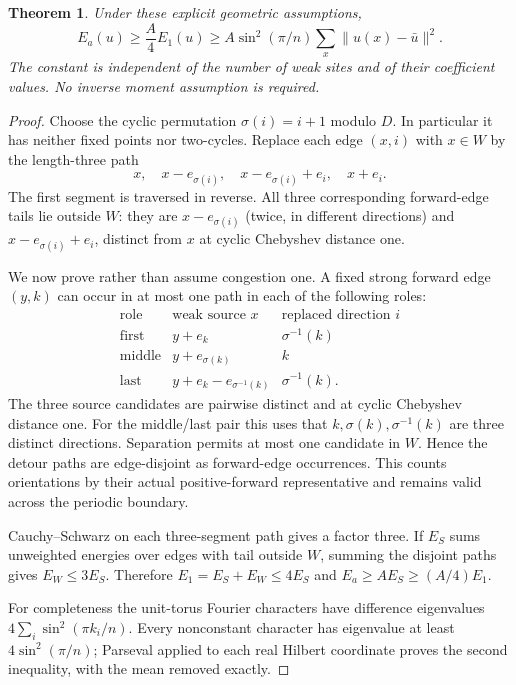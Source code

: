 \documentclass[11pt]{article}
\newtheorem{theorem}{Theorem}
\begin{document}
\begin{theorem}\label{thm:comparison}
Under these explicit geometric assumptions,
\[
 E_a(u)\ge \frac A4 E_1(u)
 \ge A\sin^2(\pi/n)\sum_x\|u(x)-\bar u\|^2.
\]
The constant is independent of the number of weak sites and of their coefficient values. No inverse moment assumption is required.
\end{theorem}
\begin{proof}
Choose the cyclic permutation $\sigma(i)=i+1$ modulo $D$. In particular it has neither fixed points nor two-cycles. Replace each edge $(x,i)$ with $x\in W$ by the length-three path
\[
 x,\quad x-e_{\sigma(i)},\quad x-e_{\sigma(i)}+e_i,\quad x+e_i.
\]
The first segment is traversed in reverse. All three corresponding forward-edge tails lie outside $W$: they are $x-e_{\sigma(i)}$ (twice, in different directions) and $x-e_{\sigma(i)}+e_i$, distinct from $x$ at cyclic Chebyshev distance one.

We now prove rather than assume congestion one. A fixed strong forward edge $(y,k)$ can occur in at most one path in each of the following roles:
\[
\begin{array}{c|c|c}
\text{role}&\text{weak source }x&\text{replaced direction }i\\\hline
\text{first}&y+e_k&\sigma^{-1}(k)\\
\text{middle}&y+e_{\sigma(k)}&k\\
\text{last}&y+e_k-e_{\sigma^{-1}(k)}&\sigma^{-1}(k).
\end{array}
\]
The three source candidates are pairwise distinct and at cyclic Chebyshev distance one. For the middle/last pair this uses that $k,\sigma(k),\sigma^{-1}(k)$ are three distinct directions. Separation permits at most one candidate in $W$. Hence the detour paths are edge-disjoint as forward-edge occurrences. This counts orientations by their actual positive-forward representative and remains valid across the periodic boundary.

Cauchy--Schwarz on each three-segment path gives a factor three. If $E_S$ sums unweighted energies over edges with tail outside $W$, summing the disjoint paths gives $E_W\le3E_S$. Therefore $E_1=E_S+E_W\le4E_S$ and $E_a\ge A E_S\ge(A/4)E_1$.

For completeness the unit-torus Fourier characters have difference eigenvalues $4\sum_i\sin^2(\pi k_i/n)$. Every nonconstant character has eigenvalue at least $4\sin^2(\pi/n)$; Parseval applied to each real Hilbert coordinate proves the second inequality, with the mean removed exactly.
\end{proof}
\end{document}
